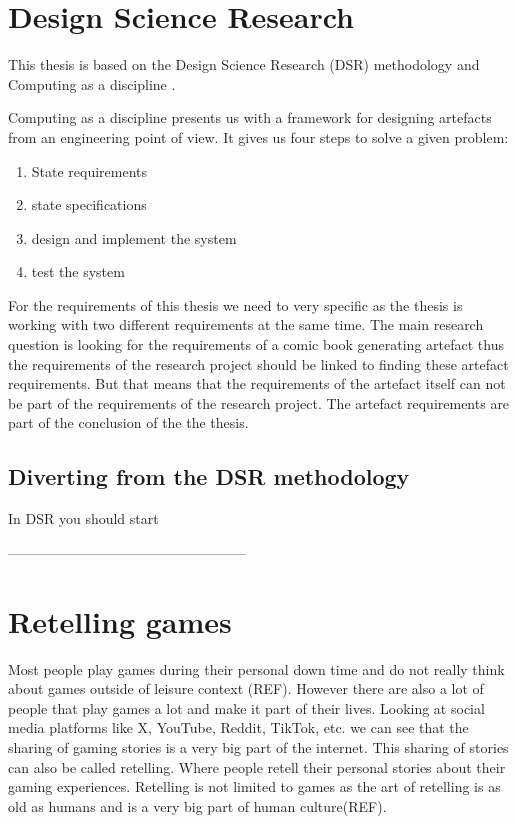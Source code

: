 

\section{Design Science Research}

This thesis is based on the Design Science Research (DSR) methodology \cite{dresch2015design} and Computing as a discipline \cite{denning1989computing}. 

Computing as a discipline presents us with a framework for designing artefacts from an engineering point of view. It gives us four steps to solve a given problem:
\begin{enumerate}
    \item State requirements
    \item state specifications
    \item design and implement the system
    \item test the system
\end{enumerate}

For the requirements of this thesis we need to very specific as the thesis is working with two different requirements at the same time. The main research question is looking for the requirements of a comic book generating artefact thus the requirements of the research project should be linked to finding these artefact requirements. But that means that the requirements of the artefact itself can not be part of the requirements of the research project. The artefact requirements are part of the conclusion of the the thesis.


\subsection{Diverting from the DSR methodology}
In DSR you should start

---------------------------------------------------
\section{Retelling games}
Most people play games during their personal down time and do not really think about games outside of leisure context (REF). However there are also a lot of people that play games a lot and make it part of their lives. Looking at social media platforms like X, YouTube, Reddit, TikTok, etc. we can see that the sharing of gaming stories is a very big part of the internet. This sharing of stories can also be called retelling. Where people retell their personal stories about their gaming experiences. Retelling is not limited to games as the art of retelling is as old as humans and is a very big part of human culture(REF).

